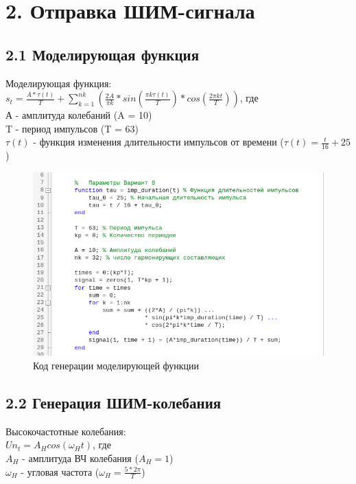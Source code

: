 \documentclass[12pt]{article}
\begin{document}
\newpage
 \section*{2. Отправка ШИМ-сигнала}%
 	\subsection*{2.1 Моделирующая функция}
	Моделирующая функция:\\
	$s_t = \frac{A*\tau (t)}{T} + \sum_{k=1}^{nk}(\frac{2A}{\pi k} * sin(\frac{\pi k \tau (t)}{T}) * cos(\frac{2\pi k t}{T}))$, где\\
	А - амплитуда колебаний (A  = 10)\\
	T - период импульсов (T = 63) \\
	$\tau (t)$ - функция изменения длительности импульсов от времени ($\tau (t) = \frac{t}{16} + 25$)\\
	
	\begin{figure}[!h]
		\centering
		\includegraphics[width=\linewidth]{code_modelSig.png}
		\caption{Код генерации моделирующей функции}
	\end{figure}

  \subsection*{2.2 Генерация ШИМ-колебания}
  	Высокочастотные колебания:\\
  	$Un_t = A_Hcos(\omega_H t)$, где\\
  		$A_H$ - амплитуда ВЧ колебания ($A_H = 1$)\\
  		$\omega_H$ - угловая частота ($\omega_H = \frac{5 * 2\pi}{T}$)\\
  	
\end{document}
